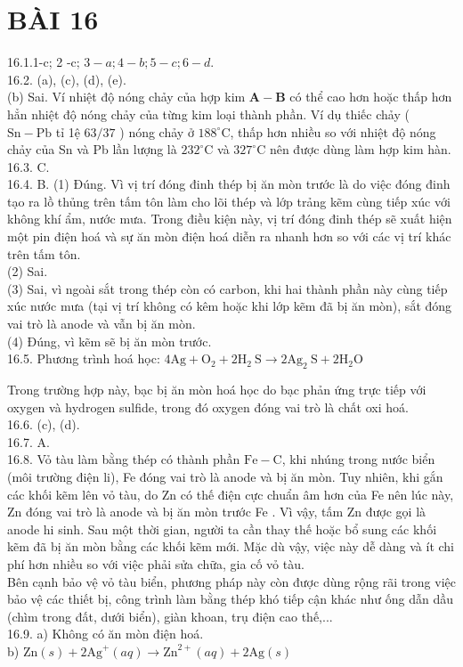 \documentclass[10pt]{article}
\begin{document}
\section*{BÀI 16}
16.1.1-c; 2 -c; $3-a ; 4-b ; 5-c ; 6-d$.\\
16.2. (a), (c), (d), (e).\\
(b) Sai. Ví nhiệt độ nóng chảy của hợp kim $\mathbf{A - B}$ có thể cao hơn hoặc thấp hơn hẳn nhiệt độ nóng chảy của từng kim loại thành phần. Ví dụ thiếc chảy ( $\mathrm{Sn}-\mathrm{Pb}$ tỉ 1ệ $63 / 37$ ) nóng chảy ở $188^{\circ} \mathrm{C}$, thấp hơn nhiều so với nhiệt độ nóng chảy của Sn và Pb lần lượng là $232^{\circ} \mathrm{C}$ và $327^{\circ} \mathrm{C}$ nên được dùng làm hợp kim hàn.\\
16.3. C.\\
16.4. B. (1) Đúng. Vì vị trí đóng đinh thép bị ăn mòn trước là do việc đóng đinh tạo ra lồ thủng trên tấm tôn làm cho lõi thép và lớp trảng kẽm cùng tiếp xúc với không khí ẩm, nước mưa. Trong điều kiện này, vị trí đóng đinh thép sẽ xuất hiện một pin điện hoá và sự ăn mòn điện hoá diễn ra nhanh hơn so với các vị trí khác trên tấm tôn.\\
(2) Sai.\\
(3) Sai, vì ngoài sắt trong thép còn có carbon, khi hai thành phần này cùng tiếp xúc nước mưa (tại vị trí không có kêm hoặc khi lớp kẽm đã bị ăn mòn), sắt đóng vai trò là anode và vẫn bị ăn mòn.\\
(4) Đúng, vì kẽm sẽ bị ăn mòn trước.\\
16.5. Phương trình hoá học: $4 \mathrm{Ag}+\mathrm{O}_{2}+2 \mathrm{H}_{2} \mathrm{~S} \rightarrow 2 \mathrm{Ag}_{2} \mathrm{~S}+2 \mathrm{H}_{2} \mathrm{O}$

Trong trường hợp này, bạc bị ăn mòn hoá học do bạc phản ứng trực tiếp với oxygen và hydrogen sulfide, trong đó oxygen đóng vai trò là chất oxi hoá.\\
16.6. (c), (d).\\
16.7. A.\\
16.8. Vỏ tàu làm bằng thép có thành phần $\mathrm{Fe}-\mathrm{C}$, khi nhúng trong nước biển (môi trường điện li), Fe đóng vai trò là anode và bị ăn mòn. Tuy nhiên, khi gắn các khối kẽm lên vỏ tàu, do Zn có thế điện cực chuẩn âm hơn của Fe nên lúc này, Zn đóng vai trò là anode và bị ăn mòn trước Fe . Vì vậy, tấm Zn được gọi là\\
anode hi sinh. Sau một thời gian, người ta cần thay thế hoặc bổ sung các khối kẽm đã bị ăn mòn bằng các khối kẽm mới. Mặc dù vậy, việc này dễ dàng và ít chi phí hơn nhiều so với việc phải sửa chữa, gia cố vỏ tàu.\\
Bên cạnh bảo vệ vỏ tàu biển, phương pháp này còn được dùng rộng rãi trong việc bảo vệ các thiết bị, công trình làm bằng thép khó tiếp cận khác như ống dẫn dầu (chìm trong đất, dưới biển), giàn khoan, trụ điện cao thế,...\\
16.9. a) Không có ăn mòn điện hoá.\\
b) $\mathrm{Zn}(s)+2 \mathrm{Ag}^{+}(a q) \rightarrow \mathrm{Zn}^{2+}(a q)+2 \mathrm{Ag}(s)$
\end{document}
